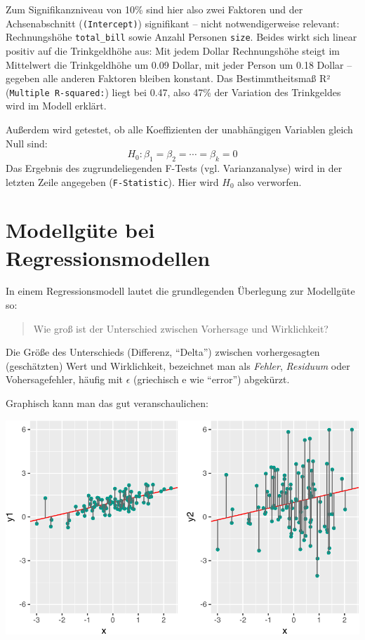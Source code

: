 \documentclass[12pt,ngerman,]{book}
\begin{document}
Zum Signifikanzniveau von 10\% sind hier also zwei Faktoren und der
Achsenabschnitt (\texttt{(Intercept)}) signifikant -- nicht
notwendigerweise relevant: Rechnungshöhe \texttt{total\_bill} sowie
Anzahl Personen \texttt{size}. Beides wirkt sich linear positiv auf die
Trinkgeldhöhe aus: Mit jedem Dollar Rechnungshöhe steigt im Mittelwert
die Trinkgeldhöhe um 0.09 Dollar, mit jeder Person um 0.18 Dollar --
gegeben alle anderen Faktoren bleiben konstant. Das Bestimmtheitsmaß R²
(\texttt{Multiple\ R-squared:}) liegt bei 0.47, also 47\% der Variation
des Trinkgeldes wird im Modell erklärt.

Außerdem wird getestet, ob alle Koeffizienten der unabhängigen Variablen
gleich Null sind: \[H_0: \beta_1=\beta_2=\cdots=\beta_k=0\] Das Ergebnis
des zugrundeliegenden F-Tests (vgl. Varianzanalyse) wird in der letzten
Zeile angegeben (\texttt{F-Statistic}). Hier wird \(H_0\) also
verworfen.

\section{Modellgüte bei
Regressionsmodellen}\label{modellgute-bei-regressionsmodellen}

In einem Regressionsmodell lautet die grundlegenden Überlegung zur
Modellgüte so:

\begin{quote}
Wie groß ist der Unterschied zwischen Vorhersage und Wirklichkeit?
\end{quote}

Die Größe des Unterschieds (Differenz, ``Delta'') zwischen
vorhergesagten (geschätzten) Wert und Wirklichkeit, bezeichnet man als
\emph{Fehler}, \emph{Residuum} oder Vohersagefehler, häufig mit
\(\epsilon\) (griechisch e wie ``error'') abgekürzt.

Graphisch kann man das gut veranschaulichen:

\begin{center}\includegraphics[width=0.7\linewidth]{071_Regression_files/figure-latex/resids-plot-1} \end{center}
\end{document}
